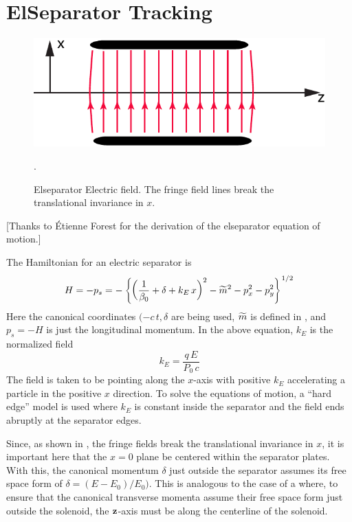 \section{ElSeparator Tracking}
\label{s:elsep.std}

\begin{figure}[tb]
  \centering
  \includegraphics[width=5in]{elseparator.pdf}
  \caption[ElSeparator electric field.]
  {
Elseparator Electric field. The fringe field lines break the
translational invariance in $x$.
  }
  \label{f:elsep}.
\end{figure}

[Thanks to \'Etienne Forest for the derivation of the elseparator equation of motion.]

The Hamiltonian for an electric separator is 
\begin{equation}
  H = -p_s 
  = - \left\{ \left( \frac{1}{\beta_0} + \delta + k_E \, x \right)^2 - 
  \widetilde m^2 - p_x^2 - p_y^2 \right\}^{1/2}
  \label{hp1b}
\end{equation}
Here the canonical coordinates $(-c \, t, \delta$ are being used, $\widetilde m$ is defined in ,
and $p_s = -H$ is just the longitudinal momentum.  In the above equation, $k_E$ is the normalized
field
\begin{equation}
  k_E = \frac{q \, E}{P_0 \, c}
\end{equation}
The field is taken to be pointing along the $x$-axis with positive $k_E$ accelerating a particle in
the positive $x$ direction. To solve the equations of motion, a ``hard edge'' model is used where
$k_E$ is constant inside the separator and the field ends abruptly at the separator edges.

Since, as shown in , the fringe fields break the translational invariance in $x$, it is
important here that the $x = 0$ plane be centered within the separator plates. With this, the
canonical momentum $\delta$ just outside the separator assumes its free space form of $\delta = (E -
E_0) / E_0)$. This is analogous to the case of a  where, to ensure that the canonical
transverse momenta assume their free space form just outside the solenoid, the ${\bf z}$-axis must be
along the centerline of the solenoid.

